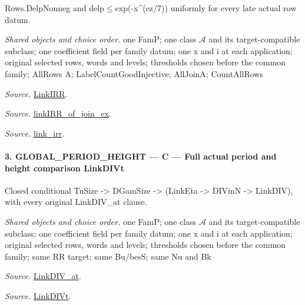 \documentclass[11pt,a4paper]{article}
\numberwithin{equation}{section}
\theoremstyle{remark}\newtheorem{remark}[theorem]{Remark}
\begin{document}
Rows.DelpNonneg and delp$\le$exp(-x\textasciicircum{}(ez/7)) uniformly for every late actual row datum.

\emph{Shared objects and choice order.} one FamP; one class $\mathcal A$ and its target-compatible subclass; one coefficient field per family datum; one x and i at each application; original selected rows, words and levels; thresholds chosen before the common family; AllRows A; LabelCountGoodInjective; AllJoinA; CountAllRows

\emph{Source.} \href{https://github.com/CocoSgt/riemann-hypothesis-lean/blob/7cbf7a0c32fca1badf05931879a37c3f8a2b03b4/src/Formalism/SharpRestriction/GlobalTheoremInputs.lean#L55-L58}{LinkIRR}.

\emph{Source.} \href{https://github.com/CocoSgt/riemann-hypothesis-lean/blob/7cbf7a0c32fca1badf05931879a37c3f8a2b03b4/src/Development/AbelianVarietyTheory/Proofs/GlobalInterpolation/LinkIRROfJoinEx.lean#L17-L38}{linkIRR\_\allowbreak of\_\allowbreak join\_\allowbreak ex}.

\emph{Source.} \href{https://github.com/CocoSgt/riemann-hypothesis-lean/blob/7cbf7a0c32fca1badf05931879a37c3f8a2b03b4/src/Development/AbelianVarietyTheory/Proofs/GlobalInterpolation/LinkIRROfJoinEx.lean#L143-L166}{link\_\allowbreak irr}.



\paragraph{3. GLOBAL\_\allowbreak PERIOD\_\allowbreak HEIGHT — C — Full actual period and height comparison LinkDIVt}

Closed conditional TuSize -> DGamSize -> (LinkEta -> DIVinN -> LinkDIV), with every original LinkDIV\_\allowbreak at clause.

\emph{Shared objects and choice order.} one FamP; one class $\mathcal A$ and its target-compatible subclass; one coefficient field per family datum; one x and i at each application; original selected rows, words and levels; thresholds chosen before the common family; same RR target; same Bu/besS; same Nu and Bk

\emph{Source.} \href{https://github.com/CocoSgt/riemann-hypothesis-lean/blob/7cbf7a0c32fca1badf05931879a37c3f8a2b03b4/src/Formalism/SharpRestriction/GlobalTheoremInputs.lean#L77-L90}{LinkDIV\_\allowbreak at}.

\emph{Source.} \href{https://github.com/CocoSgt/riemann-hypothesis-lean/blob/7cbf7a0c32fca1badf05931879a37c3f8a2b03b4/src/Formalism/SharpRestriction/GlobalTheoremInputs.lean#L94-L96}{LinkDIVt}.
\end{document}
